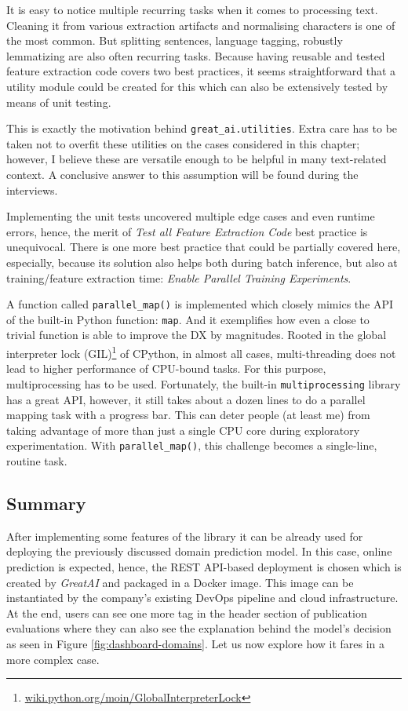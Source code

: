 It is easy to notice multiple recurring tasks when it comes to processing text. Cleaning it from various extraction artifacts and normalising characters is one of the most common. But splitting sentences, language tagging, robustly lemmatizing are also often recurring tasks. Because having reusable and tested feature extraction code covers two best practices, it seems straightforward that a utility module could be created for this which can also be extensively tested by means of unit testing.

This is exactly the motivation behind \texttt{great\_ai.utilities}. Extra care has to be taken not to overfit these utilities on the cases considered in this chapter; however, I believe these are versatile enough to be helpful in many text-related context. A conclusive answer to this assumption will be found during the interviews.

Implementing the unit tests uncovered multiple edge cases and even runtime errors, hence, the merit of \textit{Test all Feature Extraction Code} best practice is unequivocal. There is one more best practice that could be partially covered here, especially, because its solution also helps both during batch inference, but also at training/feature extraction time: \textit{Enable Parallel Training Experiments}.

A function called \texttt{parallel\_map()} is implemented which closely mimics the API of the built-in Python function: \texttt{map}. And it exemplifies how even a close to trivial function is able to improve the DX by magnitudes. Rooted in the global interpreter lock (GIL)\footnote{\href{https://wiki.python.org/moin/GlobalInterpreterLock}{wiki.python.org/moin/GlobalInterpreterLock}} of CPython, in almost all cases, multi-threading does not lead to higher performance of CPU-bound tasks. For this purpose, multiprocessing has to be used. Fortunately, the built-in \texttt{multiprocessing} library has a great API, however, it still takes about a dozen lines to do a parallel mapping task with a progress bar. This can deter people (at least me) from taking advantage of more than just a single CPU core during exploratory experimentation. With \texttt{parallel\_map()}, this challenge becomes a single-line, routine task. 

\subsection{Summary}

After implementing some features of the library it can be already used for deploying the previously discussed domain prediction model. In this case, online prediction is expected, hence, the REST API-based deployment is chosen which is created by \textit{GreatAI} and packaged in a Docker image. This image can be instantiated by the company's existing DevOps pipeline and cloud infrastructure. At the end, users can see one more tag in the header section of publication evaluations where they can also see the explanation behind the model's decision as seen in Figure \ref{fig:dashboard-domains}. Let us now explore how it fares in a more complex case.

